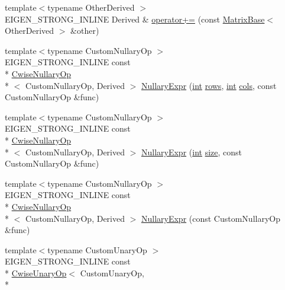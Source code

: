 \begin{DoxyCompactItemize}
\item 
{\footnotesize template$<$typename Other\-Derived $>$ }\\E\-I\-G\-E\-N\-\_\-\-S\-T\-R\-O\-N\-G\-\_\-\-I\-N\-L\-I\-N\-E Derived \& \hyperlink{class_matrix_base_ae1846ea2e78dbec27ac96ba10f5d3b8c}{operator+=} (const \hyperlink{class_matrix_base}{Matrix\-Base}$<$ Other\-Derived $>$ \&other)
\item 
{\footnotesize template$<$typename Custom\-Nullary\-Op $>$ }\\E\-I\-G\-E\-N\-\_\-\-S\-T\-R\-O\-N\-G\-\_\-\-I\-N\-L\-I\-N\-E const \\*
\hyperlink{class_cwise_nullary_op}{Cwise\-Nullary\-Op}\\*
$<$ Custom\-Nullary\-Op, Derived $>$ \hyperlink{class_matrix_base_add33afaa49ed8ee0c5664a5288b640ed}{Nullary\-Expr} (\hyperlink{ioapi_8h_a787fa3cf048117ba7123753c1e74fcd6}{int} \hyperlink{class_matrix_base_ae82810ba95da637cdf434b4274083723}{rows}, \hyperlink{ioapi_8h_a787fa3cf048117ba7123753c1e74fcd6}{int} \hyperlink{class_matrix_base_abe5381b539f87237647bc651a1ac0364}{cols}, const Custom\-Nullary\-Op \&func)
\item 
{\footnotesize template$<$typename Custom\-Nullary\-Op $>$ }\\E\-I\-G\-E\-N\-\_\-\-S\-T\-R\-O\-N\-G\-\_\-\-I\-N\-L\-I\-N\-E const \\*
\hyperlink{class_cwise_nullary_op}{Cwise\-Nullary\-Op}\\*
$<$ Custom\-Nullary\-Op, Derived $>$ \hyperlink{class_matrix_base_a17d3c71809f75de148bd5b8c02fa1b87}{Nullary\-Expr} (\hyperlink{ioapi_8h_a787fa3cf048117ba7123753c1e74fcd6}{int} \hyperlink{glext_8h_a014d89bd76f74ef3a29c8f04b473eb76}{size}, const Custom\-Nullary\-Op \&func)
\item 
{\footnotesize template$<$typename Custom\-Nullary\-Op $>$ }\\E\-I\-G\-E\-N\-\_\-\-S\-T\-R\-O\-N\-G\-\_\-\-I\-N\-L\-I\-N\-E const \\*
\hyperlink{class_cwise_nullary_op}{Cwise\-Nullary\-Op}\\*
$<$ Custom\-Nullary\-Op, Derived $>$ \hyperlink{class_matrix_base_a5cd179701e77930ab1d7b2b57d02139a}{Nullary\-Expr} (const Custom\-Nullary\-Op \&func)
\item 
{\footnotesize template$<$typename Custom\-Unary\-Op $>$ }\\E\-I\-G\-E\-N\-\_\-\-S\-T\-R\-O\-N\-G\-\_\-\-I\-N\-L\-I\-N\-E const \\*
\hyperlink{class_cwise_unary_op}{Cwise\-Unary\-Op}$<$ Custom\-Unary\-Op, \\*

\end{DoxyCompactItemize}
